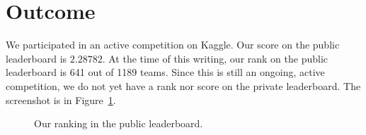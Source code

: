 \documentclass[11pt]{article}
\numberwithin{equation}{section}
\begin{document}
\section{Outcome}

We participated in an active competition on Kaggle. Our score on the public leaderboard is $2.28782$. At the time of this writing, our rank on the public leaderboard is 641 out of 1189 teams. Since this is still an ongoing, active competition, we do not yet have a rank nor score on the private leaderboard. 
The screenshot is in Figure~\ref{fig:leaderboard}.

\begin{figure}
	\begin{center}
	\end{center}
	\caption{Our ranking in the public leaderboard.}
	\label{fig:leaderboard}
\end{figure}



%



\end{document}

